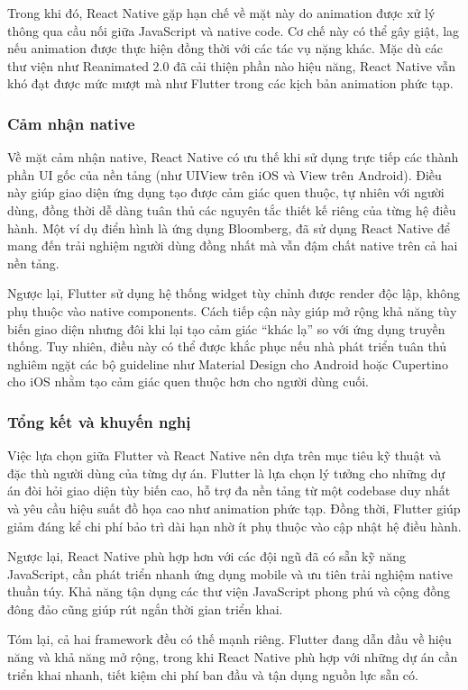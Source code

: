     \vspace{0.5em}

    Trong khi đó, React Native gặp hạn chế về mặt này do animation được xử lý thông qua cầu nối giữa JavaScript và native code. Cơ chế này có thể gây giật, lag nếu animation được thực hiện đồng thời với các tác vụ nặng khác. Mặc dù các thư viện như Reanimated 2.0 đã cải thiện phần nào hiệu năng, React Native vẫn khó đạt được mức mượt mà như Flutter trong các kịch bản animation phức tạp.

\subsubsection{Cảm nhận native}


    Về mặt cảm nhận native, React Native có ưu thế khi sử dụng trực tiếp các thành phần UI gốc của nền tảng (như UIView trên iOS và View trên Android). Điều này giúp giao diện ứng dụng tạo được cảm giác quen thuộc, tự nhiên với người dùng, đồng thời dễ dàng tuân thủ các nguyên tắc thiết kế riêng của từng hệ điều hành. Một ví dụ điển hình là ứng dụng Bloomberg, đã sử dụng React Native để mang đến trải nghiệm người dùng đồng nhất mà vẫn đậm chất native trên cả hai nền tảng.

    \vspace{0.5em}

    Ngược lại, Flutter sử dụng hệ thống widget tùy chỉnh được render độc lập, không phụ thuộc vào native components. Cách tiếp cận này giúp mở rộng khả năng tùy biến giao diện nhưng đôi khi lại tạo cảm giác “khác lạ” so với ứng dụng truyền thống. Tuy nhiên, điều này có thể được khắc phục nếu nhà phát triển tuân thủ nghiêm ngặt các bộ guideline như Material Design cho Android hoặc Cupertino cho iOS nhằm tạo cảm giác quen thuộc hơn cho người dùng cuối.

\subsubsection{Tổng kết và khuyến nghị}


    Việc lựa chọn giữa Flutter và React Native nên dựa trên mục tiêu kỹ thuật và đặc thù người dùng của từng dự án. Flutter là lựa chọn lý tưởng cho những dự án đòi hỏi giao diện tùy biến cao, hỗ trợ đa nền tảng từ một codebase duy nhất và yêu cầu hiệu suất đồ họa cao như animation phức tạp. Đồng thời, Flutter giúp giảm đáng kể chi phí bảo trì dài hạn nhờ ít phụ thuộc vào cập nhật hệ điều hành.

    \vspace{0.5em}

    Ngược lại, React Native phù hợp hơn với các đội ngũ đã có sẵn kỹ năng JavaScript, cần phát triển nhanh ứng dụng mobile và ưu tiên trải nghiệm native thuần túy. Khả năng tận dụng các thư viện JavaScript phong phú và cộng đồng đông đảo cũng giúp rút ngắn thời gian triển khai.

    \vspace{0.5em}

    Tóm lại, cả hai framework đều có thế mạnh riêng. Flutter đang dẫn đầu về hiệu năng và khả năng mở rộng, trong khi React Native phù hợp với những dự án cần triển khai nhanh, tiết kiệm chi phí ban đầu và tận dụng nguồn lực sẵn có.